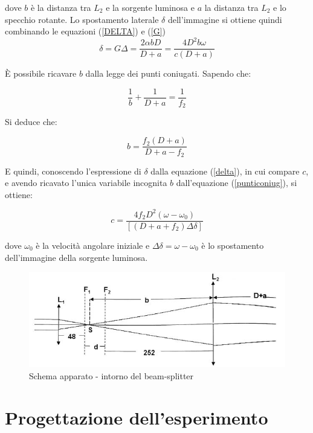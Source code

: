 \documentclass{article}
\begin{document}
dove $b$ è la distanza tra $L_2$ e la sorgente luminosa e $a$  la distanza tra $L_2$ e lo specchio rotante. Lo spostamento laterale $\delta$ dell'immagine si ottiene quindi
combinando le equazioni (\ref{DELTA}) e (\ref{G})
\begin{equation}
\delta = G\Delta =\frac{2\alpha b D}{D + a}=\frac{4 D^2 b \omega}{c(D+a)}
\label{delta}
\end{equation}

È possibile ricavare $b$ dalla legge dei punti coniugati. Sapendo che:

\begin{equation}
\frac{1}{b}+\frac{1}{D+a}=\frac{1}{f_2}
\label{punticoniug}
\end{equation}

Si deduce che:

\begin{equation}
b=\frac{f_2(D+a)}{D+a-f_2}
\end{equation}

E quindi, conoscendo l'espressione di $\delta$ dalla equazione (\ref{delta}), in cui compare $c$, e avendo ricavato l'unica variabile incognita $b$ dall'equazione
(\ref{punticoniug}), si ottiene:

\begin{equation}
c = \frac{4f_2D^2(\omega-\omega_0)}{[(D+a+f_2)\Delta\delta]}
\label{c_equation}
\end{equation}

dove $\omega_0$ è la velocità angolare iniziale e $\Delta\delta = \omega - \omega_0$ è lo spostamento dell'immagine della sorgente luminosa.

\begin{figure}[h]
    \centering
        \includegraphics[width=0.6\linewidth]{IntroTeorica1.JPG}
    \caption{Schema apparato - intorno del beam-splitter}
\end{figure}


\newpage

\section{Progettazione dell'esperimento}
\end{document}
